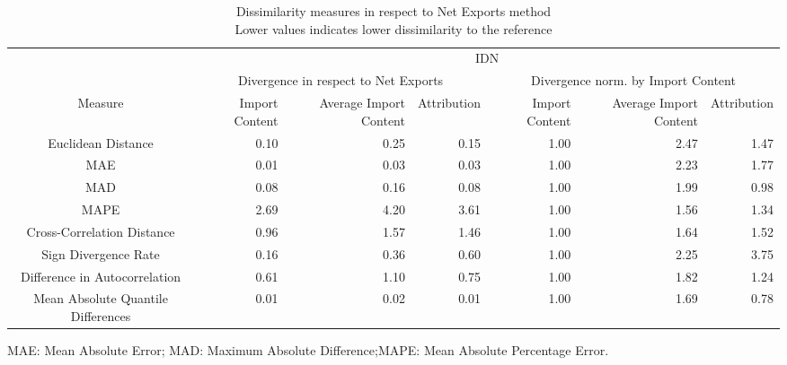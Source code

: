\begin{table}[t]
\caption*{
{\large Dissimilarity measures in respect to Net Exports method} \\ 
{\small Lower values indicates lower dissimilarity to the reference}
} 
\fontsize{15.0pt}{18.0pt}\selectfont
\begin{tabular*}{\linewidth}{@{\extracolsep{\fill}}crrrrrr}
\toprule
 & \multicolumn{6}{c}{IDN} \\ 
\cmidrule(lr){2-7}
 & \multicolumn{3}{c}{Divergence in respect to Net Exports} & \multicolumn{3}{c}{Divergence norm. by Import Content} \\ 
\cmidrule(lr){2-4} \cmidrule(lr){5-7}
Measure & Import Content & Average Import Content & Attribution & Import Content & Average Import Content & Attribution \\ 
\midrule\addlinespace[2.5pt]
Euclidean Distance & 0.10 & 0.25 & 0.15 & 1.00 & 2.47 & 1.47 \\ 
MAE & 0.01 & 0.03 & 0.03 & 1.00 & 2.23 & 1.77 \\ 
MAD & 0.08 & 0.16 & 0.08 & 1.00 & 1.99 & 0.98 \\ 
MAPE & 2.69 & 4.20 & 3.61 & 1.00 & 1.56 & 1.34 \\ 
Cross-Correlation Distance & 0.96 & 1.57 & 1.46 & 1.00 & 1.64 & 1.52 \\ 
Sign Divergence Rate & 0.16 & 0.36 & 0.60 & 1.00 & 2.25 & 3.75 \\ 
Difference in Autocorrelation & 0.61 & 1.10 & 0.75 & 1.00 & 1.82 & 1.24 \\ 
Mean Absolute Quantile Differences & 0.01 & 0.02 & 0.01 & 1.00 & 1.69 & 0.78 \\ 
\bottomrule
\end{tabular*}
\begin{minipage}{\linewidth}
MAE: Mean Absolute Error; MAD: Maximum Absolute Difference;MAPE: Mean Absolute Percentage Error.\\
\end{minipage}
\end{table}


